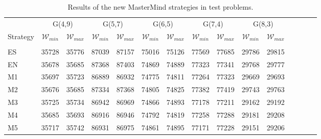 \begin{table}[!ht]
\centering
\caption{Results of the new MasterMind strategies in test problems. \label{Resultados_estrategias}}
\begin{tabular}{lcccccccccccccc}
\hline
&\multicolumn{2}{c}{G(4,9)}&\multicolumn{2}{c}{G(5,7)}&\multicolumn{2}{c}{G(6,5)}&\multicolumn{2}{c}{G(7,4)}&\multicolumn{2}{c}{G(8,3)}\\
Strategy         & $\mathcal{W}_{min}$&$\mathcal{W}_{max}$& $\mathcal{W}_{min}$&$\mathcal{W}_{max}$& $\mathcal{W}_{min}$&$\mathcal{W}_{max}$& $\mathcal{W}_{min}$&$\mathcal{W}_{max}$& $\mathcal{W}_{min}$&$\mathcal{W}_{max}$\\
\hline \\
ES&35728&35776&87039&87157&75016&75126&77569&77685&29786&29815\\
EN&35678&35685&87368&87403&74869&74889&77323&77341&29768&29777\\
\hline
\hline
M1&35697&35723&86889&86932&74775&74811&77264&77323&29669&29693\\
M2&35676&35685&87334&87368&74805&74825&77382&77419&29743&29763\\
M3&35725&35734&86942&86969&74866&74893&77178&77211&29162&29192\\
M4&35685&35693&86916&86946&74792&74819&77258&77288&29181&29208\\
M5&35717&35742&86931&86975&74861&74895&77171&77228&29151&29206\\
\hline
\end{tabular}
\end{table}


